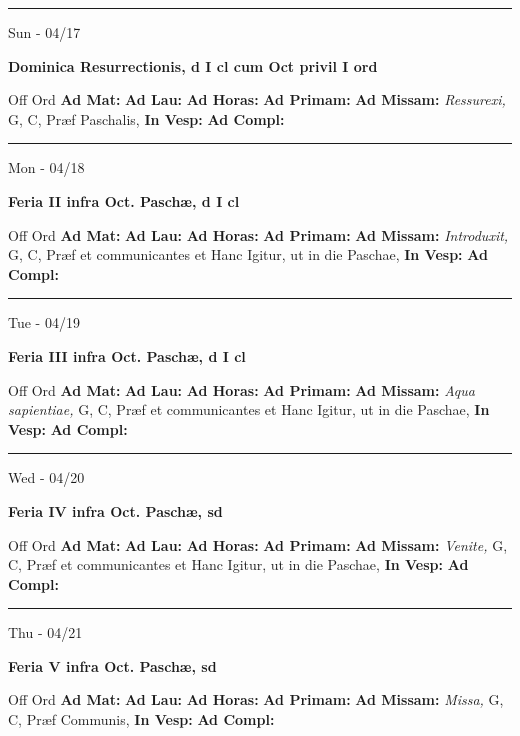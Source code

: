 \documentclass[letterpaper, 10pt]{article}
\begin{document}
\hrule
\begin{center}
Sun - 04/17
\end{center}\textbf{ \large Dominica Resurrectionis, \textnormal{\normalsize d I cl cum Oct privil I ord}}
\begin{justify}
Off Ord
\textbf{Ad Mat: }
\textbf{Ad Lau: }
\textbf{Ad Horas: }
\textbf{Ad Primam: }
\textbf{Ad Missam:} \textit{Ressurexi, } G, C, Præf Paschalis, 
\textbf{In Vesp: }
\textbf{Ad Compl: }\end{justify}



\hrule
\begin{center}
Mon - 04/18
\end{center}\textbf{ \large Feria II infra Oct. Paschæ, \textnormal{\normalsize d I cl}}
\begin{justify}
Off Ord
\textbf{Ad Mat: }
\textbf{Ad Lau: }
\textbf{Ad Horas: }
\textbf{Ad Primam: }
\textbf{Ad Missam:} \textit{Introduxit, } G, C, Præf et communicantes et Hanc Igitur, ut in die Paschae, 
\textbf{In Vesp: }
\textbf{Ad Compl: }\end{justify}



\hrule
\begin{center}
Tue - 04/19
\end{center}\textbf{ \large Feria III infra Oct. Paschæ, \textnormal{\normalsize d I cl}}
\begin{justify}
Off Ord
\textbf{Ad Mat: }
\textbf{Ad Lau: }
\textbf{Ad Horas: }
\textbf{Ad Primam: }
\textbf{Ad Missam:} \textit{Aqua sapientiae, } G, C, Præf et communicantes et Hanc Igitur, ut in die Paschae, 
\textbf{In Vesp: }
\textbf{Ad Compl: }\end{justify}



\hrule
\begin{center}
Wed - 04/20
\end{center}\textbf{ \large Feria IV infra Oct. Paschæ, \textnormal{\normalsize sd}}
\begin{justify}
Off Ord
\textbf{Ad Mat: }
\textbf{Ad Lau: }
\textbf{Ad Horas: }
\textbf{Ad Primam: }
\textbf{Ad Missam:} \textit{Venite, } G, C, Præf et communicantes et Hanc Igitur, ut in die Paschae, 
\textbf{In Vesp: }
\textbf{Ad Compl: }\end{justify}



\hrule
\begin{center}
Thu - 04/21
\end{center}\textbf{ \large Feria V infra Oct. Paschæ, \textnormal{\normalsize sd}}
\begin{justify}
Off Ord
\textbf{Ad Mat: }
\textbf{Ad Lau: }
\textbf{Ad Horas: }
\textbf{Ad Primam: }
\textbf{Ad Missam:} \textit{Missa, } G, C, Præf Communis, 
\textbf{In Vesp: }
\textbf{Ad Compl: }\end{justify}
\end{document}
